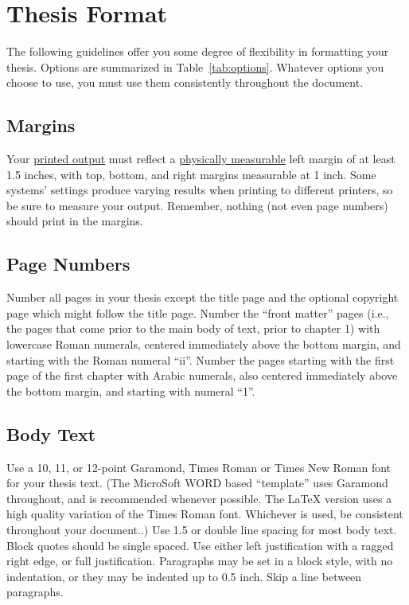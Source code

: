 \chapter{Thesis Format}
\label{cpt:format}

The following guidelines offer you some degree of flexibility in formatting
your thesis. Options are summarized in Table~\ref{tab:options}.  Whatever
options you choose to use, you must use them consistently throughout the document.

\section{Margins}

Your \underline{printed output} must reflect a \underline{physically
measurable} left margin of at least 1.5 inches, with top, bottom, and right
margins measurable at 1 inch.  Some systems' settings produce varying results
when printing to different printers, so be sure to measure your output.
Remember, nothing (not even page numbers) should print in the margins.

\section{Page Numbers}

Number all pages in your thesis except the title page and the optional
copyright page which might follow the title page.  Number the ``front matter''
pages (i.e., the pages that come prior to the main body of text, prior to
chapter 1) with lowercase Roman numerals, centered immediately above the bottom
margin, and starting with the Roman numeral ``ii''.  Number the pages starting
with the first page of the first chapter with Arabic numerals, also centered
immediately above the bottom margin, and starting with numeral ``1''.

\section{Body Text}

Use a 10, 11, or 12-point Garamond, Times Roman or Times New Roman font for
your thesis text.  {\scriptsize (The MicroSoft WORD based ``template'' uses
Garamond throughout, and is recommended whenever possible.  The \LaTeX{}
version uses a high quality variation of the Times Roman font.  Whichever is
used, be consistent throughout your document..)}  Use 1.5 or double line
spacing for most body text.  Block quotes should be single spaced.  Use either
left justification with a ragged right edge, or full justification.  Paragraphs
may be set in a block style, with no indentation, or they may be indented up to
0.5 inch.  Skip a line between paragraphs.

